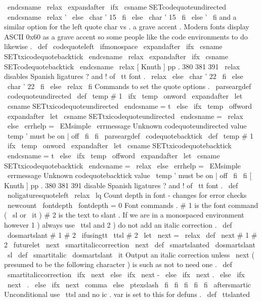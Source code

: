 {{{{\
endcsname
\
relax
\
expandafter
\
ifx
\
csname
SETcodequoteundirected
\
endcsname
\
relax
'
%
\
else
\
char
'
15
\
fi
\
else
\
char
'
15
\
fi
\
else
'
%
\
fi
}
%
%
and
a
similar
option
for
the
left
quote
char
vs
.
a
grave
accent
.
%
Modern
fonts
display
ASCII
0x60
as
a
grave
accent
so
some
people
like
%
the
code
environments
to
do
likewise
.
%
\
def
\
codequoteleft
{
%
\
ifmonospace
\
expandafter
\
ifx
\
csname
SETtxicodequotebacktick
\
endcsname
\
relax
\
expandafter
\
ifx
\
csname
SETcodequotebacktick
\
endcsname
\
relax
%
[
Knuth
]
pp
.
380
381
391
%
\
relax
disables
Spanish
ligatures
?
and
!
of
\
tt
font
.
\
relax
%
\
else
\
char
'
22
\
fi
\
else
\
char
'
22
\
fi
\
else
\
relax
%
\
fi
}
%
Commands
to
set
the
quote
options
.
%
\
parseargdef
\
codequoteundirected
{
%
\
def
\
temp
{
#
1
}
%
\
ifx
\
temp
\
onword
\
expandafter
\
let
\
csname
SETtxicodequoteundirected
\
endcsname
=
t
%
\
else
\
ifx
\
temp
\
offword
\
expandafter
\
let
\
csname
SETtxicodequoteundirected
\
endcsname
=
\
relax
\
else
\
errhelp
=
\
EMsimple
\
errmessage
{
Unknown
codequoteundirected
value
\
temp
'
must
be
on
|
off
}
%
\
fi
\
fi
}
%
\
parseargdef
\
codequotebacktick
{
%
\
def
\
temp
{
#
1
}
%
\
ifx
\
temp
\
onword
\
expandafter
\
let
\
csname
SETtxicodequotebacktick
\
endcsname
=
t
%
\
else
\
ifx
\
temp
\
offword
\
expandafter
\
let
\
csname
SETtxicodequotebacktick
\
endcsname
=
\
relax
\
else
\
errhelp
=
\
EMsimple
\
errmessage
{
Unknown
codequotebacktick
value
\
temp
'
must
be
on
|
off
}
%
\
fi
\
fi
}
%
[
Knuth
]
pp
.
380
381
391
disable
Spanish
ligatures
?
and
!
of
\
tt
font
.
\
def
\
noligaturesquoteleft
{
\
relax
\
lq
}
%
Count
depth
in
font
-
changes
for
error
checks
\
newcount
\
fontdepth
\
fontdepth
=
0
%
Font
commands
.
%
#
1
is
the
font
command
(
\
sl
or
\
it
)
#
2
is
the
text
to
slant
.
%
If
we
are
in
a
monospaced
environment
however
1
)
always
use
\
ttsl
%
and
2
)
do
not
add
an
italic
correction
.
\
def
\
dosmartslant
#
1
#
2
{
%
\
ifusingtt
{
{
\
ttsl
#
2
}
\
let
\
next
=
\
relax
}
%
{
\
def
\
next
{
{
#
1
#
2
}
\
futurelet
\
next
\
smartitaliccorrection
}
}
%
\
next
}
\
def
\
smartslanted
{
\
dosmartslant
\
sl
}
\
def
\
smartitalic
{
\
dosmartslant
\
it
}
%
Output
an
italic
correction
unless
\
next
(
presumed
to
be
the
following
%
character
)
is
such
as
not
to
need
one
.
\
def
\
smartitaliccorrection
{
%
\
ifx
\
next
%
\
else
\
ifx
\
next
-
%
\
else
\
ifx
\
next
.
%
\
else
\
ifx
\
next
\
.
%
\
else
\
ifx
\
next
\
comma
%
\
else
\
ptexslash
\
fi
\
fi
\
fi
\
fi
\
fi
\
aftersmartic
}
%
Unconditional
use
\
ttsl
and
no
ic
.
var
is
set
to
this
for
defuns
.
\
def
\
ttslanted
}}}
